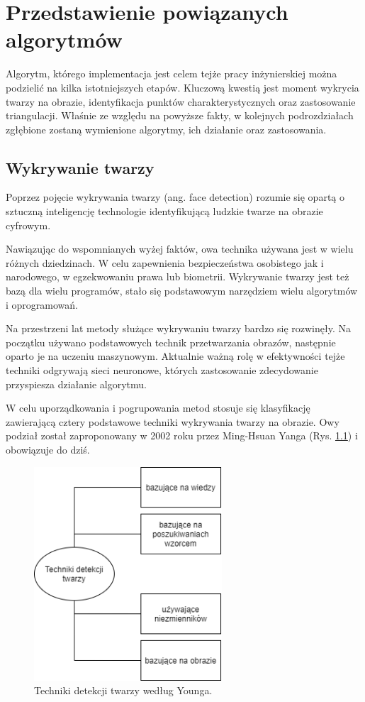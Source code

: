 \chapter{Przedstawienie powiązanych algorytmów}
\label{cha:analizaTeoretycznaProblemu}
Algorytm, którego implementacja jest celem tejże pracy inżynierskiej można podzielić na kilka istotniejszych etapów. Kluczową kwestią jest moment wykrycia twarzy na obrazie, identyfikacja punktów charakterystycznych oraz zastosowanie triangulacji. Właśnie ze względu na  powyższe fakty, w kolejnych podrozdziałach zgłębione zostaną wymienione algorytmy, ich działanie oraz zastosowania. 

\section{Wykrywanie twarzy}
Poprzez pojęcie wykrywania twarzy (ang. face detection) \cite{fDetection} rozumie się opartą o sztuczną inteligencję technologie identyfikującą ludzkie twarze na obrazie cyfrowym. 

Nawiązując do wspomnianych wyżej faktów, owa technika używana jest w wielu różnych dziedzinach. W celu zapewnienia bezpieczeństwa osobistego jak i narodowego, w egzekwowaniu prawa lub biometrii. Wykrywanie twarzy jest też bazą dla wielu programów, stało się podstawowym narzędziem wielu algorytmów i oprogramowań.

Na przestrzeni lat metody służące wykrywaniu twarzy bardzo się rozwinęły. Na początku używano podstawowych technik przetwarzania obrazów, następnie oparto je na uczeniu maszynowym. Aktualnie ważną rolę w efektywności tejże techniki odgrywają sieci neuronowe, których zastosowanie zdecydowanie przyspiesza działanie algorytmu.

W celu uporządkowania i pogrupowania metod stosuje się klasyfikację zawierającą cztery podstawowe techniki wykrywania twarzy na obrazie. Owy podział został zaproponowany w 2002 roku przez Ming-Hsuan Yanga (Rys. \ref{fig:detectionMethods}) i obowiązuje do dziś.

\begin{figure}[h]
	\centering
	\includegraphics[width=7cm]{techniki-detekcji.png}
	\caption{Techniki detekcji twarzy według Younga.} 
	\label{fig:detectionMethods}
\end{figure}

